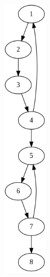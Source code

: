 \documentclass[10pt]{article} %
\begin{document}
\begin{figure}[h!]
    \centering
    \begin{subfigure}{0.45\textwidth}
        \centering
        \includegraphics[width=0.25\textwidth]{media/scc.png}
    \end{subfigure}
    \hfill
    \begin{subfigure}{0.45\textwidth}
        \centering

\end{subfigure}
\end{figure}
\end{document}
